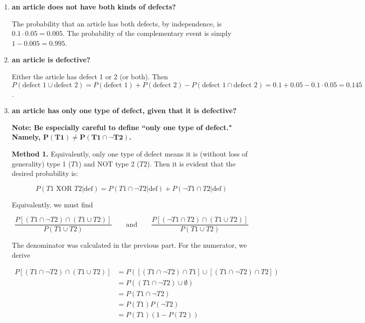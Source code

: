 \documentclass[10pt, oneside]{article}   	%
\theoremstyle{definition}
\begin{document}
\begin{enumerate}[label=3.\arabic*]
	\begin{enumerate}
	\item  \begin{tcolorbox}[
	  colback=Cerulean!5!white,
	  colframe=Cerulean!75!black]
	\textbf{an article does not have both kinds of defects?}
	\end{tcolorbox}
	
	The probability that an article has both defects, by independence, is $0.1 \cdot 0.05 = 0.005$. The probability of the complementary event is simply $1 - 0.005 = \boxed{0.995}$.
	
	\item  \begin{tcolorbox}[
	  colback=Cerulean!5!white,
	  colframe=Cerulean!75!black]
	\textbf{an article is defective?}
	\end{tcolorbox}
	
	Either the article has defect 1 or 2 (or both). Then $P(\text{defect 1} \cup \text{defect 2}) = P(\text{defect 1}) + P(\text{defect 2}) - P(\text{defect 1} \cap \text{defect 2}) = 0.1 + 0.05 - 0.1 \cdot 0.05 = \boxed{0.145}$.
	
	\item  \begin{tcolorbox}[
	  colback=Cerulean!5!white,
	  colframe=Cerulean!75!black]
	\textbf{an article has only one type of defect, given that it is defective?}
	\end{tcolorbox}
	
	\textbf{Note: Be especially careful to define ``only one type of defect." Namely, $\bm{P(T1) \neq P(T1 \cap \neg T2)}$.}
	
	\textbf{Method 1.} Equivalently, only one type of defect means it is (without loss of generality) type 1 ($T1$) and NOT type 2 ($T2$). Then it is evident that the desired probability is:
	
	\[ P(T1 \text{ XOR } T2 | \text{def}) = P(T1 \cap \neg T2 | \text{def}) + P(\neg T1 \cap T2 | \text{def}) \]
	
	Equivalently, we must find
	
	\[ \frac{P [ (T1 \cap \neg T2) \cap (T1 \cup T2) ]}{P(T1 \cup T2)} \qquad \text{and} \qquad \frac{P [ (\neg T1 \cap T2) \cap (T1 \cup T2) ]}{P(T1 \cup T2)}  \]
	
	The denominator was calculated in the previous part. For the numerator, we derive
	
	\begin{align*}
	P [ (T1 \cap \neg T2) \cap (T1 \cup T2) ] &= P([ (T1 \cap \neg T2) \cap T1 ] \cup [(T1 \cap \neg T2) \cap T2]) \\
	&= P( (T1 \cap \neg T2) \cup \emptyset) \\
	&= P(T1 \cap \neg T2) \\
	&= P(T1)P(\neg T2) \\
	&= P(T1)(1 - P(T2))
	\end{align*}
	

\end{enumerate}
\end{enumerate}
\end{document}
